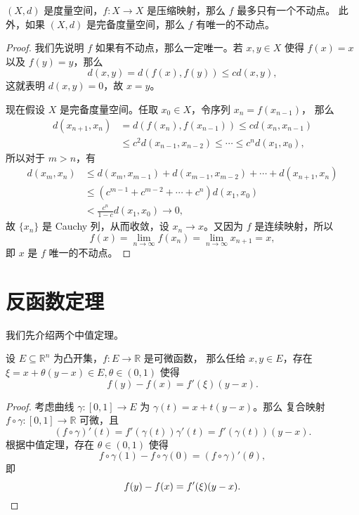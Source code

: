 \documentclass[fontset=none,zihao=-4]{Notes}
\begin{document}
\begin{theorem}[压缩映射原理]
  $(X,d)$ 是度量空间，$f:X\to X$ 是压缩映射，那么 $f$ 最多只有一个不动点。
  此外，如果 $(X,d)$ 是完备度量空间，那么 $f$ 有唯一的不动点。
\end{theorem}
\begin{proof}
  我们先说明 $f$ 如果有不动点，那么一定唯一。若 $x,y\in X$ 使得 $f(x)=x$ 以及
  $f(y)=y$，那么
  \[
    d(x,y)=d(f(x),f(y))\leq cd(x,y)  ,
  \]
  这就表明 $d(x,y)=0$，故 $x=y$。

  现在假设 $X$ 是完备度量空间。任取 $x_0\in X$，令序列 $x_n=f(x_{n-1})$，
  那么
  \begin{align*}
    d(x_{n+1},x_n)&=d(f(x_{n}),f(x_{n-1}))\le  c d(x_{n},x_{n-1})\\
    &\leq c^2d(x_{n-1},x_{n-2})\leq\cdots\leq c^{n} d(x_1,x_0),
  \end{align*}
  所以对于 $m>n$，有
  \begin{align*}
    d(x_m,x_n)&\leq d(x_m,x_{m-1})+d(x_{m-1},x_{m-2})+\cdots+d(x_{n+1},x_n)  \\
    &\leq (c^{m-1}+c^{m-2}+\cdots+c^n)d(x_1,x_0)\\
    &<\frac{c^{n}}{1-c}d(x_1,x_0)\to 0,
  \end{align*}
  故 $\{x_n\}$ 是 Cauchy 列，从而收敛，设 $x_n\to x$。又因为 $f$ 是连续映射，所以
  \[
    f(x)=\lim_{n\to\infty} f(x_n)=\lim_{n\to\infty} x_{n+1}=x,  
  \]
  即 $x$ 是 $f$ 唯一的不动点。
\end{proof}


\section{反函数定理}

我们先介绍两个中值定理。

\begin{theorem}[实值函数的微分中值定理]
  设 $E\subseteq\mathbb{R}^n$ 为凸开集，$f:E\to\mathbb{R}$ 是可微函数，
  那么任给 $x,y\in E$，存在 $\xi=x+\theta(y-x)\in E,\theta\in (0,1)$ 使得
  \[
    f(y)-f(x)=f'(\xi)(y-x).  
  \]
\end{theorem}
\begin{proof}
  考虑曲线 $\gamma:[0,1]\to E$ 为 $\gamma(t)=x+t(y-x)$。那么
  复合映射 $f\circ\gamma:[0,1]\to \mathbb{R}$ 可微，且
  \[
      (f\circ\gamma)'(t)=f'(\gamma(t))\gamma'(t)=f'(\gamma(t))(y-x).
  \]
  根据中值定理，存在 $\theta\in(0,1)$ 使得
  \[
    f\circ \gamma(1)-f\circ\gamma(0)=(f\circ\gamma)'(\theta),  
  \]
  即
  \[
    f(y)-f(x)=f'(\xi)(y-x).\qedhere  
  \]
\end{proof}
\end{document}
